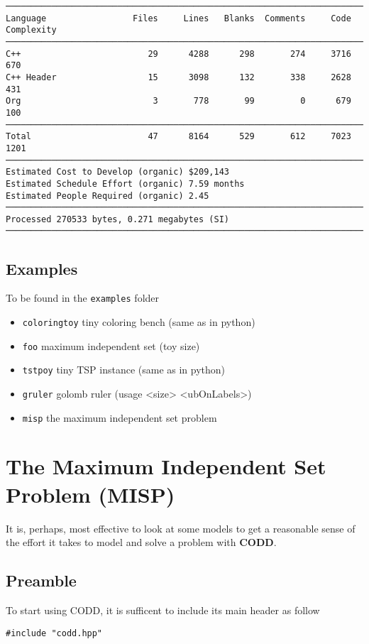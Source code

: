 \documentclass[11pt]{article}
\begin{document}
\begin{verbatim}
───────────────────────────────────────────────────────────────────────────────
Language                 Files     Lines   Blanks  Comments     Code Complexity
───────────────────────────────────────────────────────────────────────────────
C++                         29      4288      298       274     3716        670
C++ Header                  15      3098      132       338     2628        431
Org                          3       778       99         0      679        100
───────────────────────────────────────────────────────────────────────────────
Total                       47      8164      529       612     7023       1201
───────────────────────────────────────────────────────────────────────────────
Estimated Cost to Develop (organic) $209,143
Estimated Schedule Effort (organic) 7.59 months
Estimated People Required (organic) 2.45
───────────────────────────────────────────────────────────────────────────────
Processed 270533 bytes, 0.271 megabytes (SI)
───────────────────────────────────────────────────────────────────────────────

\end{verbatim}


\subsection{Examples}
\label{sec:org03eadb7}
To be found in the \texttt{examples} folder
\begin{itemize}
\item \texttt{coloringtoy} tiny coloring bench (same as in python)
\item \texttt{foo} maximum independent set (toy size)
\item \texttt{tstpoy} tiny TSP instance (same as in python)
\item \texttt{gruler} golomb ruler (usage <size> <ubOnLabels>)
\item \texttt{misp} the maximum independent set problem
\end{itemize}
\section{The Maximum Independent Set Problem (MISP)}
\label{sec:orge21c5a6}
It is, perhaps, most effective to look at some models
to get a reasonable sense of the effort it takes to model and
solve a problem with \textbf{CODD}. 
\subsection{Preamble}
\label{sec:orgc11f1fd}
To start using CODD, it is sufficent to include its main header as follow
\begin{verbatim}
#include "codd.hpp"
\end{verbatim}
\end{document}
